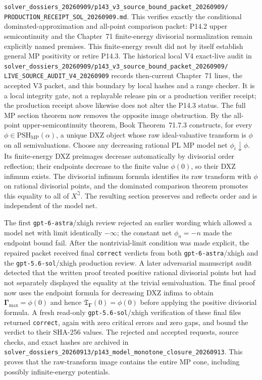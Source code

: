 \documentclass[11pt,a4paper]{article}
\theoremstyle{definition}
\theoremstyle{remark}
\newcommand{\PSH}{\mathrm{PSH}}
\newcommand{\bethan}{\mathrm{\beth}}
\begin{document}
\nolinkurl{solver_dossiers_20260909/p143_v3_source_bound_packet_20260909/}
\nolinkurl{PRODUCTION_RECEIPT_SOL_20260909.md}.  This verifies exactly the
conditional dominated-approximation and all-point comparison packet:
P14.2 upper semicontinuity and the Chapter~71 finite-energy divisorial
normalization remain explicitly named premises.  This finite-energy result
did not by itself establish general MP positivity or retire P14.3.
The historical local V4 exact-live audit in
\nolinkurl{solver_dossiers_20260909/p143_v3_source_bound_packet_20260909/}
\nolinkurl{LIVE_SOURCE_AUDIT_V4_20260909} records then-current Chapter~71
lines, the accepted V3 packet, and this boundary by local hashes and a range
checker.  It is a local integrity gate, not a replayable release pin or a
production verifier receipt; the production receipt above likewise does not
alter the P14.3 status.
The full MP section theorem now removes the opposite image obstruction.
By the all-point upper-semicontinuity theorem,
Book Theorem~71.7.3 constructs, for every
\(\phi\in\PSH_{\mathrm{MP}}(\alpha)\), a unique DXZ object whose raw
ideal-valuative transform is \(\phi\) on all semivaluations.  Choose any
decreasing rational PL MP model net \(\phi_i\downarrow\phi\).  Its
finite-energy DXZ preimages decrease automatically by divisorial order
reflection; their endpoints decrease to the finite value \(\phi(0)\), so
their DXZ infimum exists.  The divisorial infimum formula identifies its raw
transform with \(\phi\) on rational divisorial points, and the dominated
comparison theorem promotes this equality to all of \(X^{\bethan}\).  The
resulting section preserves and reflects order and is independent of the
model net.

The first \texttt{gpt-6-astra}/xhigh review rejected an earlier wording
which allowed a model net with limit identically \(-\infty\); the constant
net \(\phi_n=-n\) made the endpoint bound fail.  After the nontrivial-limit
condition was made explicit, the repaired packet received final
\texttt{correct} verdicts from both \texttt{gpt-6-astra}/xhigh and the
\texttt{gpt-5.6-sol}/xhigh production review.  A later adversarial manuscript
audit detected that the written proof treated positive rational divisorial
points but had not separately displayed the equality at the trivial
semivaluation.  The final proof now uses the endpoint formula for decreasing
DXZ infima to obtain
\(\boldsymbol\Gamma_{\max}=\phi(0)\) and hence
\(\mathfrak T_{\boldsymbol\Gamma}(0)=\phi(0)\) before applying the positive
divisorial formula.  A fresh read-only
\texttt{gpt-5.6-sol}/xhigh verification of these final files returned
\texttt{correct}, again with zero critical errors and zero gaps, and bound
the verdict to their SHA-256 values.  The rejected and accepted requests,
source checks, and exact hashes are archived in
\nolinkurl{solver_dossiers_20260913/p143_model_monotone_closure_20260913}.
This proves that the raw-transform image contains the entire MP cone,
including possibly infinite-energy potentials.
\end{document}
